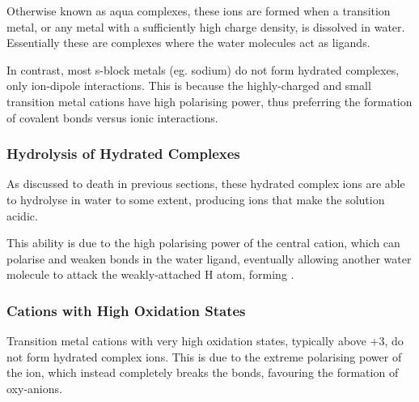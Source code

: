 			Otherwise known as aqua complexes, these ions are formed when a transition metal, or any metal with a sufficiently high charge
			density, is dissolved in water. Essentially these are complexes where the water molecules act as ligands.

			In contrast, most s-block metals (eg. sodium) do not form hydrated complexes, only ion-dipole interactions. This is because
			the highly-charged and small transition metal cations have high polarising power, thus preferring the formation of
			covalent bonds versus ionic interactions.


			\pagebreak
			\subsubsection{Hydrolysis of Hydrated Complexes}

				As discussed to death in previous sections, these hydrated complex ions are able to hydrolyse in water to some extent, producing
				 ions that make the solution acidic.

				This ability is due to the high polarising power of the central cation, which can polarise and weaken  bonds in the
				water ligand, eventually allowing another water molecule to attack the weakly-attached H atom, forming .




			\subsubsection{Cations with High Oxidation States}

				Transition metal cations with very high oxidation states, typically above +3, do not form hydrated complex ions. This is due
				to the extreme polarising power of the ion, which instead completely breaks the  bonds, favouring the formation of
				oxy-anions.

